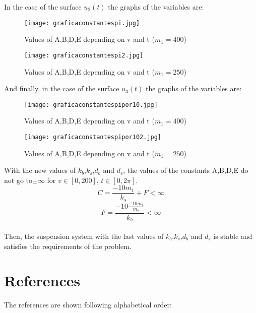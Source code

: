 \documentclass[a4paper]{article}
\begin{document}
\newpage


In the case of the surface $u_2(t)$ the graphs of the variables are:

\begin{figure}[H]
\centering
\texttt{[image: graficaconstantespi.jpg]}
\caption{\label{fig:3d_u2_400}Values of A,B,D,E depending on v and t ($m_1=400$)}
\end{figure}

\begin{figure}[H]
\centering
\texttt{[image: graficaconstantespi2.jpg]}
\caption{\label{fig:3d_u2_250}Values of A,B,D,E depending on v and t ($m_1=250$)}
\end{figure}


\newpage



And finally, in the case of the surface $u_3(t)$ the graphs of the variables are:

\begin{figure}[H]
\centering
\texttt{[image: graficaconstantespipor10.jpg]}
\caption{\label{fig:3d_u3_400}Values of A,B,D,E depending on v and t ($m_1=400$)}
\end{figure}

\begin{figure}[H]
\centering
\texttt{[image: graficaconstantespipor102.jpg]}
\caption{\label{fig:3d_u3_250}Values of A,B,D,E depending on v and t ($m_1=250$)}
\end{figure}


\newpage


With the new values of $k_b$,$k_s$,$d_b$ and $d_s$,
the values of the constants A,B,D,E do not go to$ \pm \infty$ for $v\in [0,200]$, $t\in [0,2\pi]$.
\\
$$C=\frac{-10 m_1}{k_s}+F<\infty$$
$$F=\frac{-10\frac{-10 m_1}{m_2}}{k_b}<\infty$$
\\
Then, the suspension system with the last values of $k_b$,$k_s$,$d_b$ and $d_s$ is stable
and satisfies the requirements of the problem. 



\newpage



\section{References}

The references are shown following alphabetical order:\\
\end{document}
